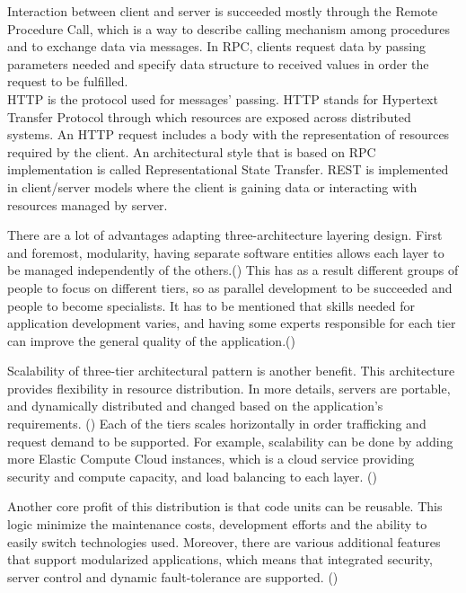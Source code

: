 Interaction between client and server is succeeded mostly through the Remote Procedure Call, which is a way to describe calling mechanism among procedures and to exchange data via messages. In RPC, clients request data by passing parameters needed and specify data structure to received values in order the request to be fulfilled. \\
HTTP is the protocol used for messages' passing. HTTP stands for Hypertext Transfer Protocol through which resources are exposed across distributed systems. An HTTP request includes a body with the representation of resources required by the client. An architectural style that is based on RPC implementation is called Representational State Transfer. REST is implemented in client/server models where the client is gaining data or interacting with resources managed by server. \par

There are a lot of advantages adapting three-architecture layering design. First and foremost, modularity, having separate software entities allows each layer to be managed independently of the others.(\cite{Reference2}) This has as a result different groups of people to focus on different tiers, so as parallel development to be succeeded and people to become specialists. It has to be mentioned that skills needed for application development varies, and having some experts responsible for each tier can improve the general quality of the application.(\cite{Reference5})\par

Scalability of three-tier architectural pattern is another benefit. This architecture provides flexibility in resource distribution. In more details, servers are portable, and dynamically distributed and changed based on the application's requirements. (\cite{Reference5})  Each of the tiers scales horizontally in order trafficking and request demand to be supported. For example, scalability can be done by adding more Elastic Compute Cloud instances, which is a cloud service providing security and compute capacity, and load balancing to each layer. (\cite{Reference2}) \par

Another core profit of this distribution is that code units can be reusable. This logic minimize the maintenance costs, development efforts and the ability to easily switch technologies used. Moreover, there are various additional features that support modularized applications, which means that integrated security, server control and dynamic fault-tolerance are supported. (\cite{Reference5})\par


